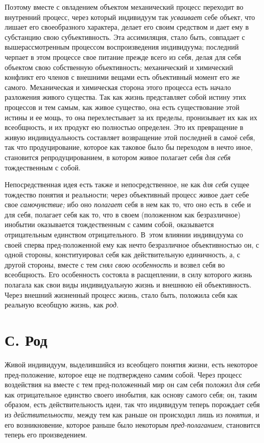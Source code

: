 Поэтому вместе с овладением объектом механический процесс
переходит во внутренний процесс, через который индивидуум так
{\em усваивает} себе
объект, что лишает его своеобразного характера, делает его своим средством
и дает ему в субстанцию свою субъективность. Эта ассимиляция, стало быть,
совпадает с вышерассмотренным процессом воспроизведения индивидуума;
последний черпает в этом процессе свое питание прежде всего из себя,
делая для себя объектом свою собственную объективность;
механический и химический конфликт его членов с внешними вещами есть
объективный момент его же самого. Механическая и химическая сторона этого
процесса есть начало разложения живого существа. Так как жизнь представляет
собой истину этих процессов и тем самым, как живое существо, она есть
существование этой истины и ее мощь, то она перехлестывает за их пределы,
пронизывает их как их всеобщность, и их продукт ею полностью определен. Это
их превращение в живую индивидуальность составляет возвращение этой
последней в самоё себя, так что продуцирование, которое как таковое было бы
переходом в нечто иное, становится репродуцированием, в котором живое
полагает себя {\em для себя}
тождественным с собой.

Непосредственная идея есть также и непосредственное, не как
{\em для себя} сущее
тождество понятия и реальности; через объективный процесс живое дает себе
свое {\em самочувствие;} ибо оно {\em полагает}
себя в нем как то, что оно есть в~себе и для себя, полагает
себя как то, что в своем (положенном как безразличное) инобытии оказывается
тождественным с самим собой, оказывается отрицательным единством
отрицательного. В~этом влиянии индивидуума со своей сперва пред-положенной
ему как нечто безразличное объективностью он, с одной стороны,
конституировал себя как действительную единичность, а, с другой стороны,
вместе с тем {\em снял свою
особенность} и возвел себя во всеобщность. Его особенность
состояла в расщеплении, в силу которого жизнь полагала как свои виды
индивидуальную жизнь и внешнюю ей объективность. Через внешний жизненный
процесс жизнь, стало быть, положила себя как реальную всеобщую жизнь, как
{\em род}.

\section[С. Род]{С. Род}

Живой индивидуум, выделившийся из всеобщего понятия жизни,
есть некоторое пред-положение, которое еще не подтверждено самим собой.
Через процесс воздействия на вместе с тем пред-положенный мир он сам себя
положил {\em для себя}
как отрицательное единство своего инобытия, как основу самого
себя; он, таким образом, есть действительность идеи, так что индивидуум
теперь порождает себя из
{\em действительности},
между тем как раньше он происходил лишь из
{\em понятия}, и его
возникновение, которое раньше было некоторым
{\em пред-полаганием},
становится теперь его произведением.

